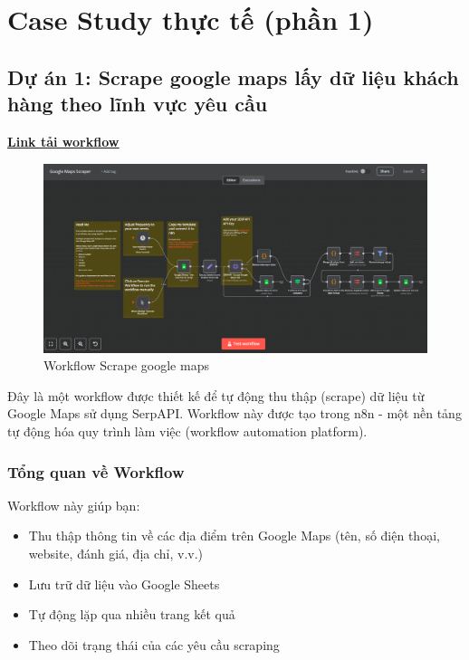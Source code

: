 \chapter{Case Study thực tế (phần 1)}


\section{\textbf{Dự án 1: Scrape google maps lấy dữ liệu khách hàng theo lĩnh vực yêu cầu }}

\href{https://drive.google.com/drive/folders/1IktM6xKkNLkmaOFLUl4w3Ezc7U0SJUlL?usp=sharing}{\textbf{\underline {Link tải workflow}}}

    \begin{figure}[H]
    \centering
    \includegraphics[width=1\textwidth]{images/2scrape01.png}
    \caption{Workflow Scrape google maps}
    \end{figure}

Đây là một workflow được thiết kế để tự động thu thập (scrape) dữ liệu từ Google Maps sử dụng SerpAPI. Workflow này được tạo trong n8n - một nền tảng tự động hóa quy trình làm việc (workflow automation platform).

\subsection{Tổng quan về Workflow}

Workflow này giúp bạn:
\begin{itemize}
  \item Thu thập thông tin về các địa điểm trên Google Maps (tên, số điện thoại, website, đánh giá, địa chỉ, v.v.)
  \item Lưu trữ dữ liệu vào Google Sheets
  \item Tự động lặp qua nhiều trang kết quả
  \item Theo dõi trạng thái của các yêu cầu scraping
\end{itemize}

